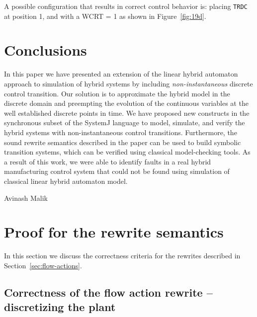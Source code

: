 \documentclass[10pt,journal,cspaper,compsoc]{IEEEtran}
\begin{document}
A possible configuration that results in correct control behavior is:
placing \texttt{TRDC} at position 1, and with a WCRT = 1 as shown in
Figure~\ref{fig:19d}.

\section{Conclusions}
\label{sec:conclusions}

In this paper we have presented an extension of the linear hybrid
automaton approach to simulation of hybrid systems by including
\textit{non-instantaneous} discrete control transition. Our solution is
to approximate the hybrid model in the discrete domain and preempting
the evolution of the continuous variables at the well established
discrete points in time. We have proposed new constructs in the
synchronous subset of the SystemJ language to model, simulate, and
verify the hybrid systems with non-instantaneous control
transitions. Furthermore, the sound rewrite semantics described in the
paper can be used to build symbolic transition systems, which can be
verified using classical model-checking tools. As a result of this work,
we were able to identify faults in a real hybrid manufacturing control
system that could not be found using simulation of classical linear
hybrid automaton model.






\begin{IEEEbiography}{Avinash Malik}
\end{IEEEbiography}









\newpage
\appendices

\section{Proof for the rewrite semantics}
\label{sec:disc-rewr-semant}

In this section we discuss the correctness criteria for the rewrites
described in Section~\ref{sec:flow-actions}.

\subsection{Correctness of the flow action rewrite -- discretizing the
  plant}
\label{sec:soundn-flow-acti}
\end{document}
